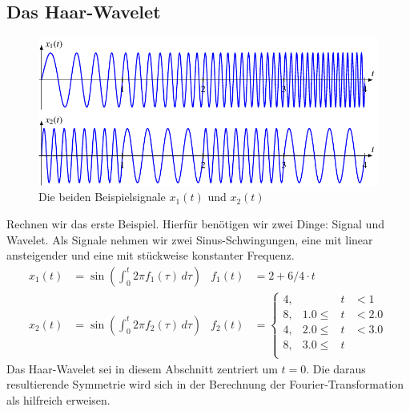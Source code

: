 \subsection{Das Haar-Wavelet}
\begin{figure}
	\centering
	\includegraphics{papers/complex/images/signals.pdf}
	\caption{Die beiden Beispielsignale $x_1(t)$ und $x_2(t)$}
\end{figure}
Rechnen wir das erste Beispiel.
Hierfür benötigen wir zwei Dinge: Signal und Wavelet.
Als Signale nehmen wir zwei Sinus-Schwingungen, eine mit linear ansteigender und eine mit stückweise konstanter Frequenz.
\begin{align}
    x_1(t) &= \sin\left( \int_{0}^{t} 2\pi f_1(\tau)\,d\tau\right) & f_1(t) &= 2 + 6/4 \cdot t \\
    x_2(t) &= \sin\left( \int_{0}^{t} 2\pi f_2(\tau)\,d\tau\right) & f_2(t) &= \left\lbrace \begin{matrix}
    4, & &t& < 1\\
    8, & 1.0 \le &t& < 2.0\\
    4, & 2.0 \le &t& < 3.0\\
    8, & 3.0 \le &t&\\
    \end{matrix}\right.
\end{align}
Das Haar-Wavelet sei in diesem Abschnitt zentriert um $t=0$.
Die daraus resultierende Symmetrie wird sich in der Berechnung der Fourier-Transformation als hilfreich erweisen.

